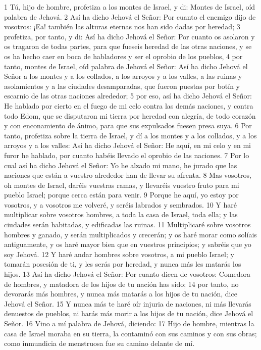 1 Tú, hijo de hombre, profetiza a los montes de Israel, y di: Montes de Israel, oíd palabra de Jehová.
2 Así ha dicho Jehová el Señor: Por cuanto el enemigo dijo de vosotros: ¡Ea! también las alturas eternas nos han sido dadas por heredad;
3 profetiza, por tanto, y di: Así ha dicho Jehová el Señor: Por cuanto os asolaron y os tragaron de todas partes, para que fueseis heredad de las otras naciones, y se os ha hecho caer en boca de habladores y ser el oprobio de los pueblos,
4 por tanto, montes de Israel, oíd palabra de Jehová el Señor: Así ha dicho Jehová el Señor a los montes y a los collados, a los arroyos y a los valles, a las ruinas y asolamientos y a las ciudades desamparadas, que fueron puestas por botín y escarnio de las otras naciones alrededor;
5 por eso, así ha dicho Jehová el Señor: He hablado por cierto en el fuego de mi celo contra las demás naciones, y contra todo Edom, que se disputaron mi tierra por heredad con alegría, de todo corazón y con enconamiento de ánimo, para que sus expulsados fuesen presa suya.
6 Por tanto, profetiza sobre la tierra de Israel, y dí a los montes y a los collados, y a los arroyos y a los valles: Así ha dicho Jehová el Señor: He aquí, en mi celo y en mi furor he hablado, por cuanto habéis llevado el oprobio de las naciones.
7 Por lo cual así ha dicho Jehová el Señor: Yo he alzado mi mano, he jurado que las naciones que están a vuestro alrededor han de llevar su afrenta.
8 Mas vosotros, oh montes de Israel, daréis vuestras ramas, y llevaréis vuestro fruto para mi pueblo Israel; porque cerca están para venir.
9 Porque he aquí, yo estoy por vosotros, y a vosotros me volveré, y seréis labrados y sembrados.
10 Y haré multiplicar sobre vosotros hombres, a toda la casa de Israel, toda ella; y las ciudades serán habitadas, y edificadas las ruinas.
11 Multiplicaré sobre vosotros hombres y ganado, y serán multiplicados y crecerán; y os haré morar como solíais antiguamente, y os haré mayor bien que en vuestros principios; y sabréis que yo soy Jehová.
12 Y haré andar hombres sobre vosotros, a mi pueblo Israel; y tomarán posesión de ti, y les serás por heredad, y nunca más les matarás los hijos.
13 Así ha dicho Jehová el Señor: Por cuanto dicen de vosotros: Comedora de hombres, y matadora de los hijos de tu nación has sido;
14 por tanto, no devorarás más hombres, y nunca más matarás a los hijos de tu nación, dice Jehová el Señor.
15 Y nunca más te haré oír injuria de naciones, ni más llevarás denuestos de pueblos, ni harás más morir a los hijos de tu nación, dice Jehová el Señor.
16 Vino a mí palabra de Jehová, diciendo:
17 Hijo de hombre, mientras la casa de Israel moraba en su tierra, la contaminó con sus caminos y con sus obras; como inmundicia de menstruosa fue su camino delante de mí.
